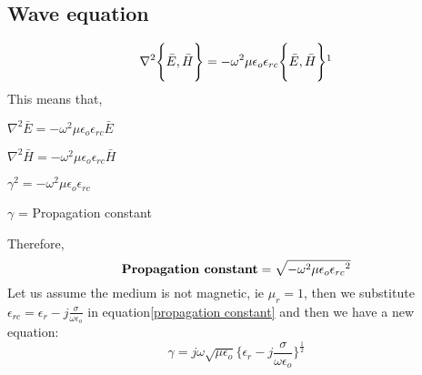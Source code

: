 \subsection{Wave equation}
\begin{equation}
\nabla^{2}
\Bigg\{\bar{E},\bar{H}\Bigg\} = -\omega^{2}\mu\epsilon_{o}\epsilon_{rc}\Bigg\{\bar{E},\bar{H}\Bigg\}\footnotemark  
\end{equation}
This means that,
\begin{center}
$\nabla^{2}\bar{E} = -\omega^{2}\mu\epsilon_{o}\epsilon_{rc}\bar{E}$ 
\end{center}
\begin{center}
$\nabla^{2}\bar{H} = -\omega^{2}\mu\epsilon_{o}\epsilon_{rc}\bar{H}$ 
\end{center}
\begin{center}
$\gamma^{2} = -\omega^{2}\mu\epsilon_{o}\epsilon_{rc}$
\end{center}
\begin{center}
$\gamma$ = Propagation constant
\end{center}
Therefore,
\begin{equation}
\textbf{Propagation constant}= \sqrt{-\omega^{2}\mu\epsilon_{o}\epsilon_{rc}\footnotemark
}
\label{propagation constant}
\end{equation}
Let us assume the medium is not magnetic, ie $\mu_{r} = 1$, then we substitute $\epsilon_{rc} = \epsilon_{r} -j \frac{\sigma}{\omega\epsilon_{o}}$ in equation\ref{propagation constant} and then we have a new equation:
\begin{equation}
\gamma = j\omega\sqrt{\mu\epsilon_{o}}\Bigg\{\epsilon_{r} - j \dfrac{\sigma}{\omega\epsilon_{o}}\Bigg\}^{\frac{1}{2}}
\end{equation}
